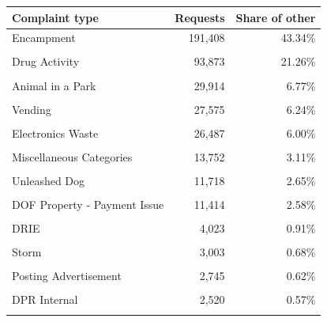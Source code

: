\begin{tabular}{@{}lrr@{}}
\toprule
Complaint type & Requests & Share of other \\
\midrule
Encampment & 191,408 & 43.34\% \\\\
Drug Activity & 93,873 & 21.26\% \\\\
Animal in a Park & 29,914 & 6.77\% \\\\
Vending & 27,575 & 6.24\% \\\\
Electronics Waste & 26,487 & 6.00\% \\\\
Miscellaneous Categories & 13,752 & 3.11\% \\\\
Unleashed Dog & 11,718 & 2.65\% \\\\
DOF Property - Payment Issue & 11,414 & 2.58\% \\\\
DRIE & 4,023 & 0.91\% \\\\
Storm & 3,003 & 0.68\% \\\\
Posting Advertisement & 2,745 & 0.62\% \\\\
DPR Internal & 2,520 & 0.57\% \\\\
\bottomrule
\end{tabular}
